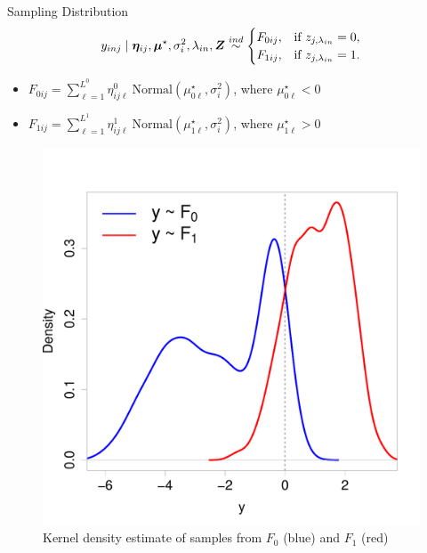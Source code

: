\documentclass[ignorenonframetext,]{beamer}
\newcommand{\bZ}{\mbox{\boldmath $Z$}}
\newcommand{\ind}{\overset{ind}{\sim}}
\def\bmu{\bm{\mu}}
\def\bet{\bm{\eta}}
\begin{document}
\begin{frame}{Sampling Distribution}
\begin{align*}
y_{inj} \mid \bet_{ij}, \bmu^\star, \sigma^2_i, \lambda_{in}, \bZ \ind
\begin{cases}
  F_{0ij}, &\mbox{if $z_{j,\lambda_{in}}=0$},\\
  F_{1ij}, &\mbox{if $z_{j,\lambda_{in}}=1$}.\\
\end{cases} \label{eq:y-mix}
\end{align*}
\pause
%
\begin{itemize}
  \item $F_{0ij} = \sum_{\ell=1}^{L^0} \eta^0_{ij\ell}~\text{Normal}(\mu^\star_{0\ell}, \sigma^2_i)$, where $\mu^\star_{0\ell} < 0$
  \item $F_{1ij} = \sum_{\ell=1}^{L^1} \eta^1_{ij\ell}~\text{Normal}(\mu^\star_{1\ell}, \sigma^2_i)$, where $\mu^\star_{1\ell} > 0$
\end{itemize}
%
\begin{figure}
  \begin{center}
    \includegraphics[scale=.2]{img/mixture.pdf}
    \caption{Kernel density estimate of samples from $F_0$ (blue) and $F_1$ (red)}
  \end{center}
\end{figure}
\end{frame}
\end{document}
